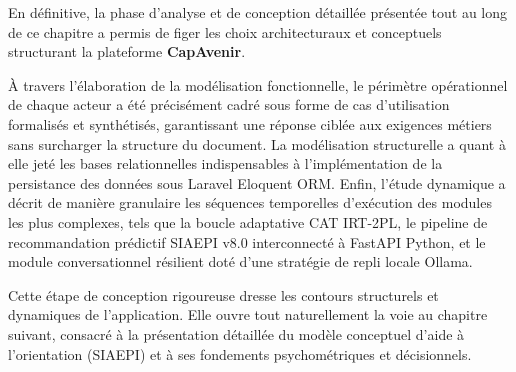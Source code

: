 En définitive, la phase d'analyse et de conception détaillée présentée tout au long de ce chapitre a permis de figer les choix architecturaux et conceptuels structurant la plateforme \textbf{CapAvenir}. 

À travers l'élaboration de la modélisation fonctionnelle, le périmètre opérationnel de chaque acteur a été précisément cadré sous forme de cas d'utilisation formalisés et synthétisés, garantissant une réponse ciblée aux exigences métiers sans surcharger la structure du document. La modélisation structurelle a quant à elle jeté les bases relationnelles indispensables à l'implémentation de la persistance des données sous Laravel Eloquent ORM. Enfin, l'étude dynamique a décrit de manière granulaire les séquences temporelles d'exécution des modules les plus complexes, tels que la boucle adaptative CAT IRT-2PL, le pipeline de recommandation prédictif SIAEPI v8.0 interconnecté à FastAPI Python, et le module conversationnel résilient doté d'une stratégie de repli locale Ollama.

Cette étape de conception rigoureuse dresse les contours structurels et dynamiques de l'application. Elle ouvre tout naturellement la voie au chapitre suivant, consacré à la présentation détaillée du modèle conceptuel d'aide à l'orientation (SIAEPI) et à ses fondements psychométriques et décisionnels.
